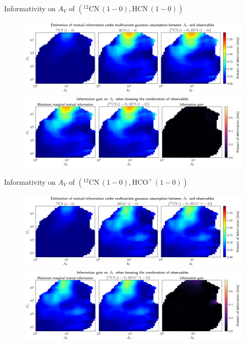 \documentclass{beamer}
\begin{document}
\begin{frame}{Informativity on $A_V$ of $\left(\mathrm{^{12}CN\,(1-0)},\mathrm{HCN\,(1-0)}\right)$}
    \begin{figure}
        \centering
        \includegraphics[width=0.95\linewidth]{../linearinfo/av__12cn10_hcn10_linearinfo.png}
        \vfill
        \includegraphics[width=0.95\linewidth]{../linearinfo/av__12cn10_hcn10_linearinfo_gain.png}
    \end{figure}
\end{frame}

\begin{frame}{Informativity on $A_V$ of $\left(\mathrm{^{12}CN\,(1-0)},\mathrm{HCO^+\,(1-0)}\right)$}
    \begin{figure}
        \centering
        \includegraphics[width=0.95\linewidth]{../linearinfo/av__12cn10_hcop10_linearinfo.png}
        \vfill
        \includegraphics[width=0.95\linewidth]{../linearinfo/av__12cn10_hcop10_linearinfo_gain.png}
    \end{figure}
\end{frame}
\end{document}

